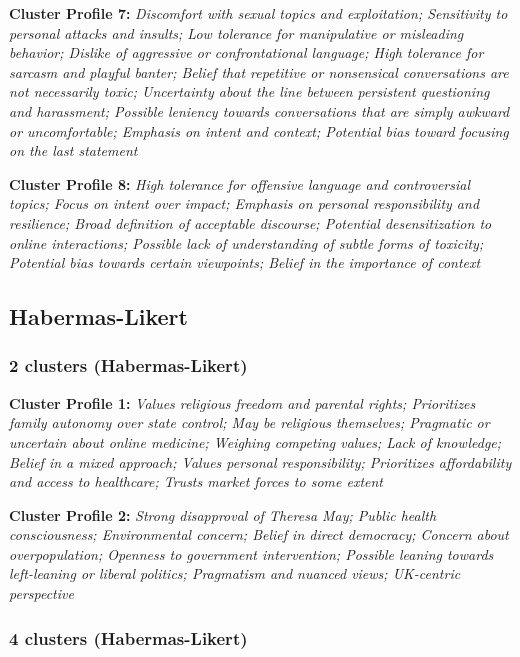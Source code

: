 \documentclass[11pt]{article}
\newcommand{\profiletext}[1]{\textit{#1}}
\begin{document}
\textbf{Cluster Profile 7:} \profiletext{Discomfort with sexual topics and exploitation; Sensitivity to personal attacks and insults; Low tolerance for manipulative or misleading behavior; Dislike of aggressive or confrontational language; High tolerance for sarcasm and playful banter; Belief that repetitive or nonsensical conversations are not necessarily toxic; Uncertainty about the line between persistent questioning and harassment; Possible leniency towards conversations that are simply awkward or uncomfortable; Emphasis on intent and context; Potential bias toward focusing on the last statement}

\textbf{Cluster Profile 8:} \profiletext{High tolerance for offensive language and controversial topics; Focus on intent over impact; Emphasis on personal responsibility and resilience; Broad definition of acceptable discourse; Potential desensitization to online interactions; Possible lack of understanding of subtle forms of toxicity; Potential bias towards certain viewpoints; Belief in the importance of context}


\subsection{Habermas-Likert}

\subsubsection{2 clusters (Habermas-Likert)}

\textbf{Cluster Profile 1:} \profiletext{Values religious freedom and parental rights; Prioritizes family autonomy over state control; May be religious themselves; Pragmatic or uncertain about online medicine; Weighing competing values; Lack of knowledge; Belief in a mixed approach; Values personal responsibility; Prioritizes affordability and access to healthcare; Trusts market forces to some extent}

\textbf{Cluster Profile 2:} \profiletext{Strong disapproval of Theresa May; Public health consciousness; Environmental concern; Belief in direct democracy; Concern about overpopulation; Openness to government intervention; Possible leaning towards left-leaning or liberal politics; Pragmatism and nuanced views; UK-centric perspective}

\subsubsection{4 clusters (Habermas-Likert)}
\end{document}
